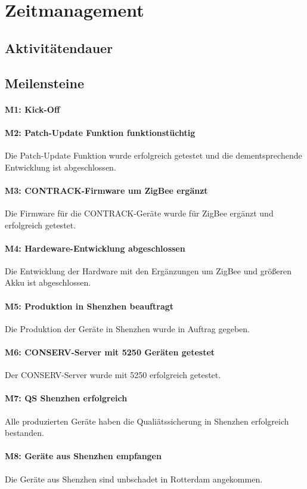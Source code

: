 \section{Zeitmanagement}
\subsection{Aktivitätendauer}


\subsection{Meilensteine}

\paragraph{M1: Kick-Off}
\paragraph{M2: Patch-Update Funktion funktionstüchtig} Die Patch-Update Funktion wurde erfolgreich getestet und die dementsprechende Entwicklung ist abgeschlossen.
\paragraph{M3: CONTRACK-Firmware um ZigBee ergänzt} Die Firmware für die CONTRACK-Geräte wurde für ZigBee ergänzt und erfolgreich getestet.
\paragraph{M4: Hardeware-Entwicklung abgeschlossen} Die Entwicklung der Hardware mit den Ergänzungen um ZigBee und größeren Akku ist abgeschlossen.
\paragraph{M5: Produktion in Shenzhen beauftragt} Die Produktion der Geräte in Shenzhen wurde in Auftrag gegeben.
\paragraph{M6: CONSERV-Server mit 5250 Geräten getestet} Der CONSERV-Server wurde mit 5250 erfolgreich getestet.
\paragraph{M7: QS Shenzhen erfolgreich} Alle produzierten Geräte haben die Qualiätssicherung in Shenzhen erfolgreich bestanden.
\paragraph{M8: Geräte aus Shenzhen empfangen} Die Geräte aus Shenzhen sind unbschadet in Rotterdam angekommen.
